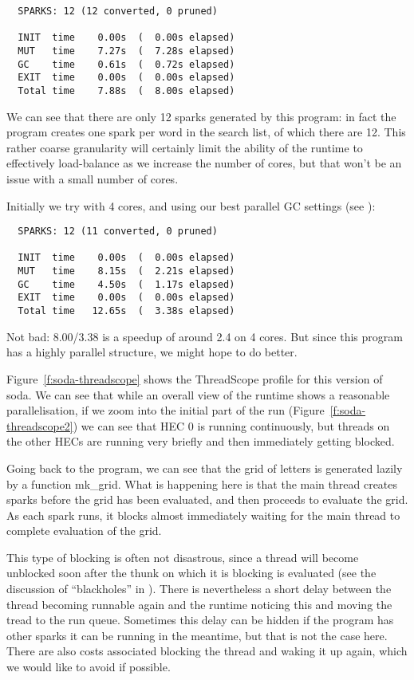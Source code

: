 \documentclass[twocolumn,9pt]{sigplanconf}
\newcommand{\codef}[1]{{\fontfamily{cmss}\small#1}}
\let\cite=\citep
\begin{document}
\begin{verbatim}
  SPARKS: 12 (12 converted, 0 pruned)

  INIT  time    0.00s  (  0.00s elapsed)
  MUT   time    7.27s  (  7.28s elapsed)
  GC    time    0.61s  (  0.72s elapsed)
  EXIT  time    0.00s  (  0.00s elapsed)
  Total time    7.88s  (  8.00s elapsed)
\end{verbatim}

We can see that there are only 12 sparks generated by this program: in
fact the program creates one spark per word in the search list, of
which there are 12.  This rather coarse granularity will certainly
limit the ability of the runtime to effectively load-balance as we
increase the number of cores, but that won't be an issue with a small
number of cores.

Initially we try with 4 cores, and using our best parallel GC settings
(see \cite{multicore-ghc}):

\begin{verbatim}
  SPARKS: 12 (11 converted, 0 pruned)

  INIT  time    0.00s  (  0.00s elapsed)
  MUT   time    8.15s  (  2.21s elapsed)
  GC    time    4.50s  (  1.17s elapsed)
  EXIT  time    0.00s  (  0.00s elapsed)
  Total time   12.65s  (  3.38s elapsed)
\end{verbatim}

Not bad: 8.00/3.38 is a speedup of around 2.4 on 4 cores.  But since
this program has a highly parallel structure, we might hope to do
better.  

Figure~\ref{f:soda-threadscope} shows the ThreadScope profile for this
version of soda.  We can see that while an overall view of the runtime
shows a reasonable parallelisation, if we zoom into the initial part
of the run (Figure~\ref{f:soda-threadscope2}) we can see that HEC 0 is
running continuously, but threads on the other HECs are running very
briefly and then immediately getting blocked.

Going back to the program, we can see that the grid of letters is
generated lazily by a function \codef{mk\_grid}.  What is happening here is
that the main thread creates sparks before the grid has been
evaluated, and then proceeds to evaluate the grid.  As each spark
runs, it blocks almost immediately waiting for the main thread to
complete evaluation of the grid.

This type of blocking is often not disastrous, since a thread will become
unblocked soon after the thunk on which it is blocking is evaluated
(see the discussion of ``blackholes'' in \citet{multicore-ghc}).  There
is nevertheless a short delay between the thread becoming runnable
again and the runtime noticing this and moving the tread to the run
queue.  Sometimes this delay can be hidden if the program has other
sparks it can be running in the meantime, but that is not the case
here.  There are also costs associated blocking the thread and waking
it up again, which we would like to avoid if possible.
\end{document}
